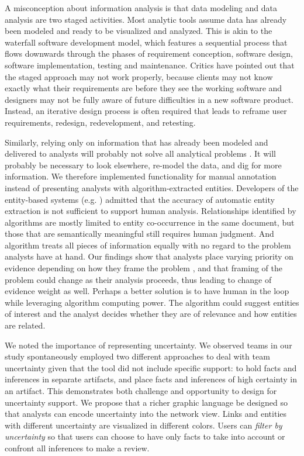 A misconception about information analysis is that data modeling and
data analysis are two staged activities. Most analytic tools assume data
has already been modeled and ready to be visualized and analyzed. This
is akin to the waterfall software development model, which features a
sequential process that flows downwards through the phases of
requirement conception, software design, software implementation,
testing and maintenance. Critics have pointed out that the staged
approach may not work properly, because clients may not know exactly
what their requirements are before they see the working software and
designers may not be fully aware of future difficulties in a new
software product. Instead, an iterative design process is often required
that leads to reframe user requirements, redesign, redevelopment, and
retesting.

Similarly, relying only on information that has already been modeled and
delivered to analysts will probably not solve all analytical problems
\autocite{Heuer1999}. It will probably be necessary to look elsewhere, re-model
the data, and dig for more information. We therefore implemented functionality
for manual annotation instead of presenting analysts with algorithm-extracted
entities. Developers of the entity-based systems (e.g. \autocite{Gorg2014})
admitted that the accuracy of automatic entity extraction is not sufficient to
support human analysis. Relationships identified by algorithms are mostly
limited to entity co-occurrence in the same document, but those that are
semantically meaningful still requires human judgment. And algorithm treats all
pieces of information equally with no regard to the problem analysts have at
hand. Our findings show that analysts place varying priority on evidence
depending on how they frame the problem \autocite{Heuer1999}, and that framing
of the problem could change as their analysis proceeds, thus leading to change
of evidence weight as well. Perhaps a better solution is to have human in the
loop while leveraging algorithm computing power. The algorithm could suggest
entities of interest and the analyst decides whether they are of relevance and
how entities are related.


We noted the importance of representing uncertainty. We observed teams
in our study spontaneously employed two different approaches to deal
with team uncertainty given that the tool did not include specific
support: to hold facts and inferences in separate artifacts, and place
facts and inferences of high certainty in an artifact. This demonstrates
both challenge and opportunity to design for uncertainty support. We
propose that a richer graphic language be designed so that analysts can
encode uncertainty into the network view. Links and entities with
different uncertainty are visualized in different colors. Users can
\emph{filter by uncertainty} so that users can choose to have only facts
to take into account or confront all inferences to make a review.

